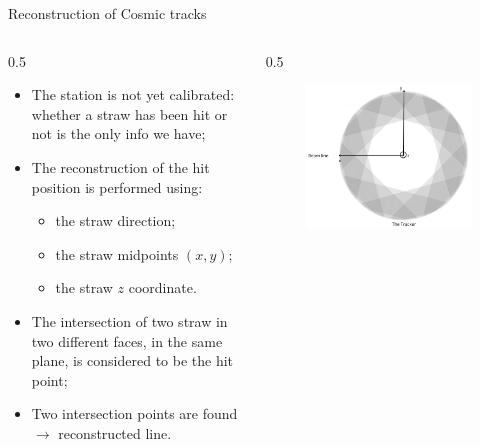 \documentclass{beamer}[10pt]
\begin{document}
\begin{frame}{Reconstruction of Cosmic tracks}
  \begin{columns}
    \begin{column}{0.5 \framewidth}
      \begin{itemize}
  \item The station is not yet calibrated: whether a straw has been hit or not is the only info we have;
  \vspace{2mm}

  \item The reconstruction of the hit position is performed using:
  \vspace{1mm}

    \begin{itemize}
        \item the straw direction;
        \vspace{1mm}

        \item the straw midpoints $(x,y)$;
        \vspace{1mm}
        \item the straw $z$ coordinate.
    \end{itemize} 
    \vspace{2mm}
    \item The intersection of two straw in two different faces, in the same plane, is considered to be the hit point;
    \vspace{1mm}
    \item  Two intersection points are found $\rightarrow$ reconstructed line.
  \end{itemize} 
  \end{column}
  \begin{column}{0.5 \framewidth}
    \begin{figure}[H]
      \centering
      \includegraphics[width=0.8 \columnwidth]{figures/png/Screenshot_20240408_154724.png}
      \label{fig:enter-label}
  \end{figure}
  \end{column}

  \end{columns}
  \end{frame}
\end{document}

